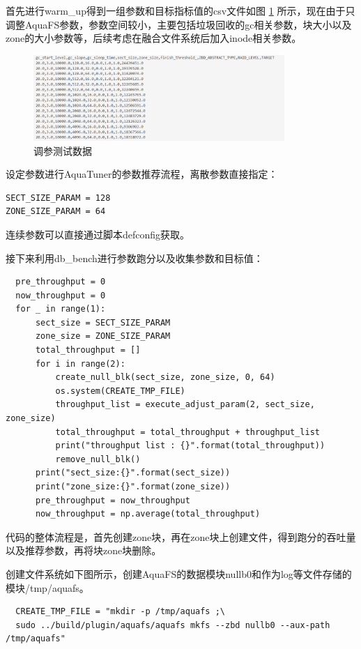 首先进行warm\_up得到一组参数和目标指标值的csv文件如图 \ref{test-turnner1} 所示，现在由于只调整AquaFS参数，参数空间较小，主要包括垃圾回收的gc相关参数，块大小以及zone的大小参数等，后续考虑在融合文件系统后加入inode相关参数。

\begin{figure}[htbp]
  \centering
  \includegraphics[width=0.85\textwidth]{fig/turnner1.png}
  \caption{ 调参测试数据 }
  \label{test-turnner1}
\end{figure}

设定参数进行AquaTuner的参数推荐流程，离散参数直接指定：

\begin{lstlisting}
SECT_SIZE_PARAM = 128
ZONE_SIZE_PARAM = 64
\end{lstlisting}

连续参数可以直接通过脚本defconfig获取。

接下来利用db\_bench进行参数跑分以及收集参数和目标值：

\begin{lstlisting}
  pre_throughput = 0
  now_throughput = 0
  for _ in range(1):
      sect_size = SECT_SIZE_PARAM
      zone_size = ZONE_SIZE_PARAM
      total_throughput = []
      for i in range(2):
          create_null_blk(sect_size, zone_size, 0, 64)
          os.system(CREATE_TMP_FILE)
          throughput_list = execute_adjust_param(2, sect_size, zone_size)
          total_throughput = total_throughput + throughput_list
          print("throughput list : {}".format(total_throughput))
          remove_null_blk()
      print("sect_size:{}".format(sect_size))
      print("zone_size:{}".format(zone_size))
      pre_throughput = now_throughput
      now_throughput = np.average(total_throughput)
\end{lstlisting}

代码的整体流程是，首先创建zone块，再在zone块上创建文件，得到跑分的吞吐量以及推荐参数，再将块zone块删除。

创建文件系统如下图所示，创建AquaFS的数据模块nullb0和作为log等文件存储的模块/tmp/aquafs。

\begin{lstlisting}
  CREATE_TMP_FILE = "mkdir -p /tmp/aquafs ;\
  sudo ../build/plugin/aquafs/aquafs mkfs --zbd nullb0 --aux-path /tmp/aquafs"
\end{lstlisting}

